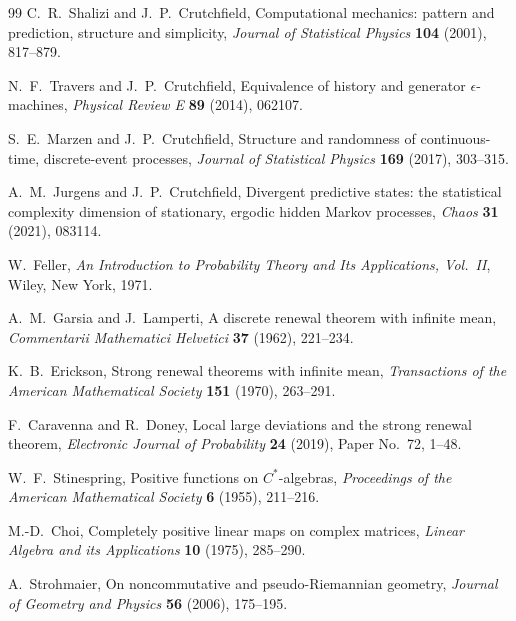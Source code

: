 \documentclass[11pt]{article}
\numberwithin{equation}{section}
\theoremstyle{definition}
\theoremstyle{remark}
\begin{document}
\begin{thebibliography}{99}
C.~R.~Shalizi and J.~P.~Crutchfield,
\newblock Computational mechanics: pattern and prediction, structure and
simplicity,
\newblock \emph{Journal of Statistical Physics} \textbf{104} (2001),
817--879.

N.~F.~Travers and J.~P.~Crutchfield,
\newblock Equivalence of history and generator $\epsilon$-machines,
\newblock \emph{Physical Review E} \textbf{89} (2014), 062107.

S.~E.~Marzen and J.~P.~Crutchfield,
\newblock Structure and randomness of continuous-time, discrete-event
processes,
\newblock \emph{Journal of Statistical Physics} \textbf{169} (2017),
303--315.

A.~M.~Jurgens and J.~P.~Crutchfield,
\newblock Divergent predictive states: the statistical complexity dimension
of stationary, ergodic hidden Markov processes,
\newblock \emph{Chaos} \textbf{31} (2021), 083114.

W.~Feller,
\newblock \emph{An Introduction to Probability Theory and Its Applications,
Vol.~II},
\newblock Wiley, New York, 1971.

A.~M.~Garsia and J.~Lamperti,
\newblock A discrete renewal theorem with infinite mean,
\newblock \emph{Commentarii Mathematici Helvetici} \textbf{37} (1962),
221--234.

K.~B.~Erickson,
\newblock Strong renewal theorems with infinite mean,
\newblock \emph{Transactions of the American Mathematical Society}
\textbf{151} (1970), 263--291.

F.~Caravenna and R.~Doney,
\newblock Local large deviations and the strong renewal theorem,
\newblock \emph{Electronic Journal of Probability} \textbf{24} (2019),
Paper No.~72, 1--48.

W.~F.~Stinespring,
\newblock Positive functions on $C^*$-algebras,
\newblock \emph{Proceedings of the American Mathematical Society}
\textbf{6} (1955), 211--216.

M.-D.~Choi,
\newblock Completely positive linear maps on complex matrices,
\newblock \emph{Linear Algebra and its Applications} \textbf{10} (1975),
285--290.

A.~Strohmaier,
\newblock On noncommutative and pseudo-Riemannian geometry,
\newblock \emph{Journal of Geometry and Physics} \textbf{56} (2006),
175--195.


\end{thebibliography}
\end{document}
